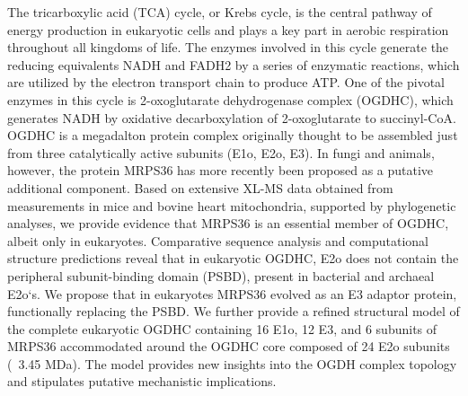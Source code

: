 \newpage
\begin{abstract101} 
The tricarboxylic acid (TCA) cycle, or Krebs cycle, is the central pathway of energy production in eukaryotic cells and plays a key part in aerobic respiration throughout all kingdoms of life. The enzymes involved in this cycle generate the reducing equivalents NADH and FADH2 by a series of enzymatic reactions, which are utilized by the electron transport chain to produce ATP. One of the pivotal enzymes in this cycle is 2-oxoglutarate dehydrogenase complex (OGDHC), which generates NADH by oxidative decarboxylation of 2-oxoglutarate to succinyl-CoA. OGDHC is a megadalton protein complex originally thought to be assembled just from three catalytically active subunits (E1o, E2o, E3). In fungi and animals, however, the protein MRPS36 has more recently been proposed as a putative additional component. Based on extensive XL-MS data obtained from measurements in mice and bovine heart mitochondria, supported by phylogenetic analyses, we provide evidence that MRPS36 is an essential member of OGDHC, albeit only in eukaryotes. Comparative sequence analysis and computational structure predictions reveal that in eukaryotic OGDHC, E2o does not contain the peripheral subunit-binding domain (PSBD), present in bacterial and archaeal E2o`s. We propose that in eukaryotes MRPS36 evolved as an E3 adaptor protein, functionally replacing the PSBD. We further provide a refined structural model of the complete eukaryotic OGDHC containing 16 E1o, 12 E3, and 6 subunits of MRPS36 accommodated around the OGDHC core composed of 24 E2o subunits (~3.45 MDa). The model provides new insights into the OGDH complex topology and stipulates putative mechanistic implications.
\end{abstract101}

